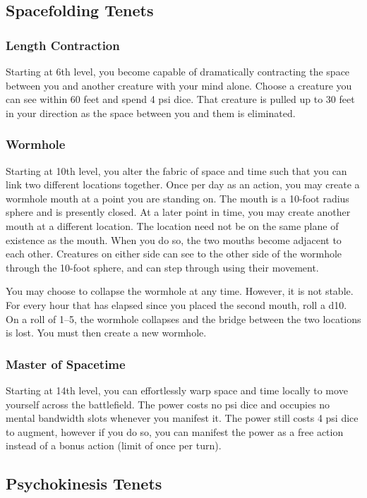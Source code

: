 \subsection{Spacefolding Tenets}
\subsubsection{Length Contraction}
Starting at 6th level,
you become capable of dramatically contracting the space between you
and another creature with your mind alone. 
Choose a creature you can see within 60 feet and spend 4 psi dice.
That creature is pulled up to 30 feet in your direction as the space
between you and them is eliminated.

\subsubsection{Wormhole}
Starting at 10th level,
you alter the fabric of space and time such that
you can link two different locations together.
Once per day as an action,
you may create a wormhole mouth at a point you are standing on.
The mouth is a 10-foot radius sphere and is presently closed.
At a later point in time,
you may create another mouth at a different location.
The location need not be on the same plane of existence
as the mouth.
When you do so, the two mouths become adjacent to each other.
Creatures on either side can see to the other side of the wormhole
through the 10-foot sphere,
and can step through using their movement.

You may choose to collapse the wormhole at any time.
However, it is not stable.
For every hour that has elapsed since you placed the second mouth,
roll a d10.
On a roll of 1--5,
the wormhole collapses and the bridge between the two locations
is lost.
You must then create a new wormhole.

\subsubsection{Master of Spacetime}
Starting at 14th level,
you can effortlessly warp space and time locally to
move yourself across the battlefield.
The  power costs no psi dice
and occupies no mental bandwidth slots
whenever you manifest it.
The power still costs 4 psi dice to augment,
however if you do so,
you can manifest the power as a free action
instead of a bonus action
(limit of once per turn).

\subsection{Psychokinesis Tenets}
